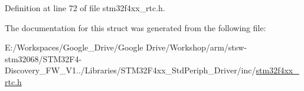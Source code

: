 Definition at line 72 of file stm32f4xx\-\_\-rtc.\-h.



The documentation for this struct was generated from the following file\-:\begin{DoxyCompactItemize}
\item 
E\-:/\-Workspaces/\-Google\-\_\-\-Drive/\-Google Drive/\-Workshop/arm/stsw-\/stm32068/\-S\-T\-M32\-F4-\/\-Discovery\-\_\-\-F\-W\-\_\-\-V1../\-Libraries/\-S\-T\-M32\-F4xx\-\_\-\-Std\-Periph\-\_\-\-Driver/inc/\hyperlink{stm32f4xx__rtc_8h}{stm32f4xx\-\_\-rtc.\-h}\end{DoxyCompactItemize}
